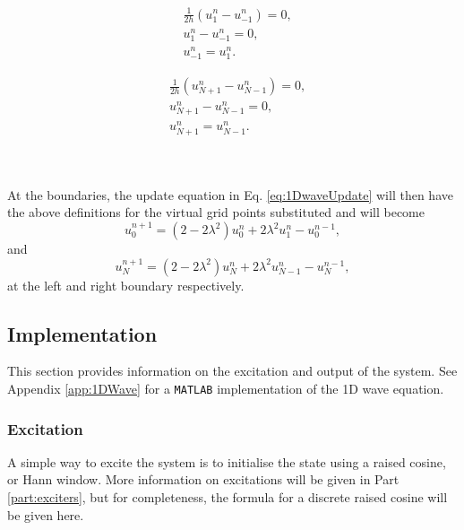 \begin{minipage}[c]{0.49\textwidth}
    \begin{align*}
        &\frac{1}{2h} \left(u_1^n - u_{-1}^n\right) = 0,\\
        &u_1^n - u_{-1}^n = 0,\\
        &u_{-1}^n = u_1^n.
    \end{align*}
\end{minipage}
\begin{minipage}[c]{0.49\textwidth}
    \begin{align*}
        &\frac{1}{2h} \left(u_{N+1}^n - u_{N-1}^n\right) = 0,\\
        &u_{N+1}^n - u_{N-1}^n = 0,\\
        &u_{N+1}^n = u_{N-1}^n.
    \end{align*}
\end{minipage}
\\
\\
\noindent At the boundaries, the update equation in Eq. \eqref{eq:1DwaveUpdate} will then have the above definitions for the virtual grid points substituted and will become 
\begin{equation}\label{eq:1DWaveLeftBound}
    u_0^{n+1} = \left(2-2\lambda^2\right) u_0^n  + 2\lambda^2 u_1^n - u_0^{n-1},
\end{equation}
and 
\begin{equation}\label{eq:1DWaveRightBound}
    u_N^{n+1} = \left(2-2\lambda^2\right) u_N^n  + 2\lambda^2 u_{N-1}^n - u_N^{n-1},
\end{equation}
at the left and right boundary respectively.

\subsection{Implementation}\label{sec:output1DWave}
This section provides information on the excitation and output of the system. See Appendix \ref{app:1DWave} for a \texttt{MATLAB} implementation of the 1D wave equation.

\subsubsection{Excitation}
A simple way to excite the system is to initialise the state using a raised cosine, or Hann window. More information on excitations will be given in Part \ref{part:exciters}, but for completeness, the formula for a discrete raised cosine will be given here. 

